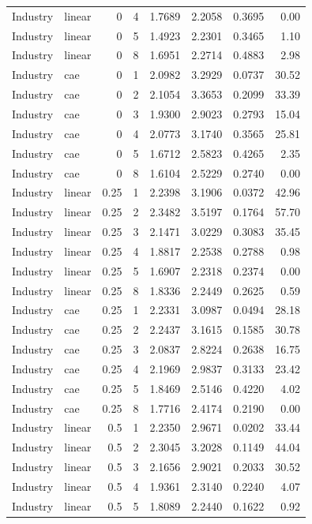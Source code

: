 \begin{longtable}{llrrrrrr}
Industry & linear & 0 & 4 & 1.7689 & 2.2058 & 0.3695 & 0.00 \\
Industry & linear & 0 & 5 & 1.4923 & 2.2301 & 0.3465 & 1.10 \\
Industry & linear & 0 & 8 & 1.6951 & 2.2714 & 0.4883 & 2.98 \\
Industry & cae & 0 & 1 & 2.0982 & 3.2929 & 0.0737 & 30.52 \\
Industry & cae & 0 & 2 & 2.1054 & 3.3653 & 0.2099 & 33.39 \\
Industry & cae & 0 & 3 & 1.9300 & 2.9023 & 0.2793 & 15.04 \\
Industry & cae & 0 & 4 & 2.0773 & 3.1740 & 0.3565 & 25.81 \\
Industry & cae & 0 & 5 & 1.6712 & 2.5823 & 0.4265 & 2.35 \\
Industry & cae & 0 & 8 & 1.6104 & 2.5229 & 0.2740 & 0.00 \\
Industry & linear & 0.25 & 1 & 2.2398 & 3.1906 & 0.0372 & 42.96 \\
Industry & linear & 0.25 & 2 & 2.3482 & 3.5197 & 0.1764 & 57.70 \\
Industry & linear & 0.25 & 3 & 2.1471 & 3.0229 & 0.3083 & 35.45 \\
Industry & linear & 0.25 & 4 & 1.8817 & 2.2538 & 0.2788 & 0.98 \\
Industry & linear & 0.25 & 5 & 1.6907 & 2.2318 & 0.2374 & 0.00 \\
Industry & linear & 0.25 & 8 & 1.8336 & 2.2449 & 0.2625 & 0.59 \\
Industry & cae & 0.25 & 1 & 2.2331 & 3.0987 & 0.0494 & 28.18 \\
Industry & cae & 0.25 & 2 & 2.2437 & 3.1615 & 0.1585 & 30.78 \\
Industry & cae & 0.25 & 3 & 2.0837 & 2.8224 & 0.2638 & 16.75 \\
Industry & cae & 0.25 & 4 & 2.1969 & 2.9837 & 0.3133 & 23.42 \\
Industry & cae & 0.25 & 5 & 1.8469 & 2.5146 & 0.4220 & 4.02 \\
Industry & cae & 0.25 & 8 & 1.7716 & 2.4174 & 0.2190 & 0.00 \\
Industry & linear & 0.5 & 1 & 2.2350 & 2.9671 & 0.0202 & 33.44 \\
Industry & linear & 0.5 & 2 & 2.3045 & 3.2028 & 0.1149 & 44.04 \\
Industry & linear & 0.5 & 3 & 2.1656 & 2.9021 & 0.2033 & 30.52 \\
Industry & linear & 0.5 & 4 & 1.9361 & 2.3140 & 0.2240 & 4.07 \\
Industry & linear & 0.5 & 5 & 1.8089 & 2.2440 & 0.1622 & 0.92 \\

\end{longtable}
